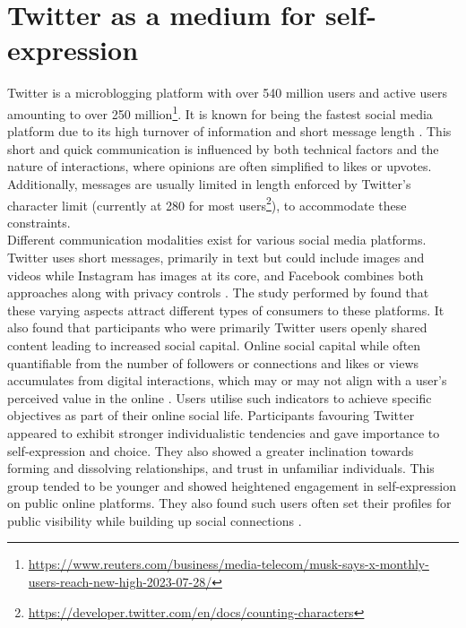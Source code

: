 \section{Twitter as a medium for self-expression}
Twitter is a microblogging platform with over 540 million users and active users amounting to over 250 million\footnote{\url{https://www.reuters.com/business/media-telecom/musk-says-x-monthly-users-reach-new-high-2023-07-28/}}. It is known for being the fastest social media platform due to its high turnover of information and short message length \cite{istanbulluogluComplaintHandlingSocial2017}. This short and quick communication is influenced by both technical factors and the nature of interactions, where opinions are often simplified to likes or upvotes. Additionally, messages are usually limited in length enforced by Twitter's character limit (currently at 280 for most users\footnote{\url{https://developer.twitter.com/en/docs/counting-characters}}), to accommodate these constraints. \\

Different communication modalities exist for various social media platforms. Twitter uses short messages, primarily in text but could include images and videos while Instagram has images at its core, and Facebook combines both approaches along with privacy controls \cite{shane-simpsonWhyCollegeStudents2018}. The study performed by \cite{shane-simpsonWhyCollegeStudents2018} found that these varying aspects attract different types of consumers to these platforms. It also found that participants who were primarily Twitter users openly shared content leading to increased social capital. Online social capital while often quantifiable from the number of followers or connections and likes or views accumulates from digital interactions, which may or may not align with a user's perceived value in the online \cite{faucherSocialCapitalOnline2018}. Users utilise such indicators to achieve specific objectives as part of their online social life. Participants favouring Twitter appeared to exhibit stronger individualistic tendencies and gave importance to self-expression and choice. They also showed a greater inclination towards forming and dissolving relationships, and trust in unfamiliar individuals. This group tended to be younger and showed heightened engagement in self-expression on public online platforms. They also found such users often set their profiles for public visibility while building up social connections \cite{shane-simpsonWhyCollegeStudents2018}.\\


